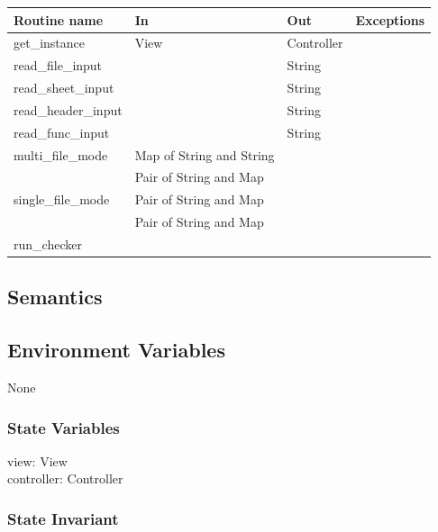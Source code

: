 \documentclass[12pt]{article}
\begin{document}
\begin{tabular}{| l | l | l | p{4.7cm} |}
\hline
\textbf{Routine name} & \textbf{In} & \textbf{Out} & \textbf{Exceptions}\\
\hline
get\_instance & View & Controller & \\
\hline
read\_file\_input & & String & \\
\hline
read\_sheet\_input & & String & \\
\hline
read\_header\_input & & String & \\
\hline
read\_func\_input & & String & \\
\hline
multi\_file\_mode & Map of String and String & &\\
                  & Pair of String and Map &  & \\
\hline
single\_file\_mode & Pair of String and Map & &\\
                   & Pair of String and Map & & \\
\hline
run\_checker & & & \\
\hline
\end{tabular}

\subsection* {Semantics}

\subsection*{Environment Variables}

None

\subsubsection* {State Variables}

view: View \\
controller: Controller

\subsubsection* {State Invariant}
\end{document}
